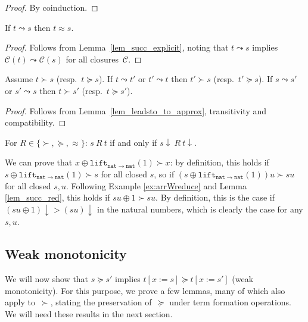 \documentclass[a4paper,UKenglish,cleveref,autoref,numberwithinsect]{lipics-v2019}
\theoremstyle{definition}
\newcommand{\arrtype}{\rightarrow}
\newcommand{\subst}[2]{#1:=#2}
\newcommand{\arrW}{\leadsto}
\newcommand{\nat}{\mathtt{nat}}
\newcommand{\lift}{\mathtt{lift}}
\newcommand{\cl}{\mathcal{C}}
\begin{document}
\begin{proof}
  By coinduction.
\end{proof}

\begin{lemma}\label{lem_leadsto_to_approx}
  If $t \arrW s$ then $t \approx s$.
\end{lemma}

\begin{proof}
  Follows from Lemma~\ref{lem_succ_explicit}, noting that $t \arrW s$
  implies $\cl(t) \arrW \cl(s)$ for all closures~$\cl$.
\end{proof}

\begin{lemma}\label{lem_succ_red}
  Assume $t \succ s$ (resp.~$t \succeq s$). If $t \leadsto t'$ or
  $t' \leadsto t$ then $t' \succ s$ (resp.~$t' \succeq s$). If
  $s \leadsto s'$ or $s' \leadsto s$ then $t \succ s'$
  (resp.~$t \succeq s'$).
\end{lemma}

\begin{proof}
  Follows from Lemma~\ref{lem_leadsto_to_approx}, transitivity and
  compatibility.
\end{proof}

\begin{corollary}\label{cor_succ_da}
  For $R \in \{\succ,\succeq,\approx\}$: $s\ R\ t$ if and only if
  $s\downarrow\ R\ t\downarrow$.
\end{corollary}

\begin{example}\label{ex:plus1}
We can prove that $x \oplus \lift_{\nat \arrtype \nat}(1)
\succ x$: by
definition, this holds if $s \oplus \lift_{\nat \arrtype \nat}(1) \succ
s$ for all closed $s$, so if $(s \oplus \lift_{\nat \arrtype \nat}(1))u
\succ s u$ for all closed $s,u$.
Following Example \ref{ex:arrWreduce} and Lemma \ref{lem_succ_red},
this holds if $s u \oplus 1 \succ s u$.  By definition, this is the
case if $(s u \oplus 1)\downarrow > (s u)\downarrow$ in the natural numbers,
which is clearly the case for any $s,u$.
\end{example}

\subsection{Weak monotonicity}\label{subsec:weakmono}

We will now show that $s \succeq s'$ implies $t[\subst{x}{s}] \succeq
t[\subst{x}{s'}]$ (weak monotonicity).
For this purpose, we prove a few lemmas, many of
which also apply to~$\succ$, stating the preservation of~$\succeq$
under term formation operations. We will need these results in the next section.
\end{document}
